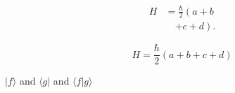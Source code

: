 \documentclass{article}
\begin{document}
\begin{align}
  H & = \frac{\hbar}{2} \left( a + b \right. \nonumber \\
    & \quad \left. + c + d \right).
\end{align}

\begin{equation}
  H = \frac{\hbar}{2} \left( a + b + c + d \right)
\end{equation}

\(|f\rangle\) and \(\langle g|\) and \(\langle f | g \rangle\)
\end{document}
